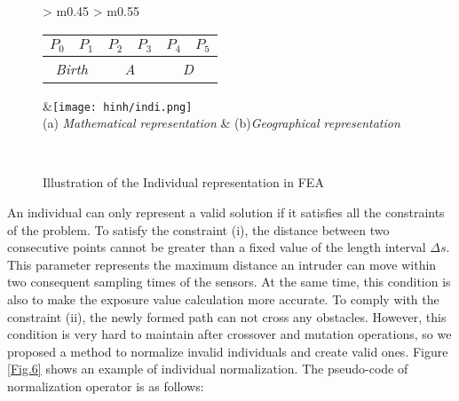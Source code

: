 \documentclass[final]{elsarticle}
\begin{document}
\begin{figure*}[h]
	\renewcommand{\arraystretch}{1.5}
	\centering
	\begin{tabular}{ >{\centering\arraybackslash} m{0.45\linewidth} >{\centering\arraybackslash} m{0.55\linewidth} }
		\begin{tabular}{|c|c|c|c|c|c|}
			\hline 
			$P_0$ & $P_1$ & $P_2$ & $P_3$ & $P_4$ & $P_5$  \\
			\hline \hline
			\multicolumn{2}{|c|}{\textit{Birth}} & \multicolumn{2}{c|}{\textit{A}}  & \multicolumn{2}{c|}{\textit{D}}  \\
			\hline
		\end{tabular} &\texttt{[image: hinh/indi.png]} \\
		(a) \textit{Mathematical representation} & (b)\textit{Geographical representation} \\
	\end{tabular}
	\\
	\caption{Illustration of the Individual representation in FEA
	}
	\label{Fig.4}       %
\end{figure*}

An individual can only represent a valid solution if it satisfies all the constraints of the problem. To satisfy the constraint (i), the distance between two consecutive points cannot be greater than a fixed value of the length interval $\Delta s$. This parameter represents the maximum distance an intruder can move within two consequent sampling times of the sensors. At the same time, this condition is also to make the exposure value calculation more accurate. To comply with the constraint (ii), the newly formed path can not cross any obstacles. However, this condition is very hard to maintain after crossover and mutation operations, so we proposed a method to normalize invalid individuals and create valid ones. Figure \ref{Fig.6} shows an example of individual normalization. The pseudo-code of normalization operator is as follows:
\end{document}
